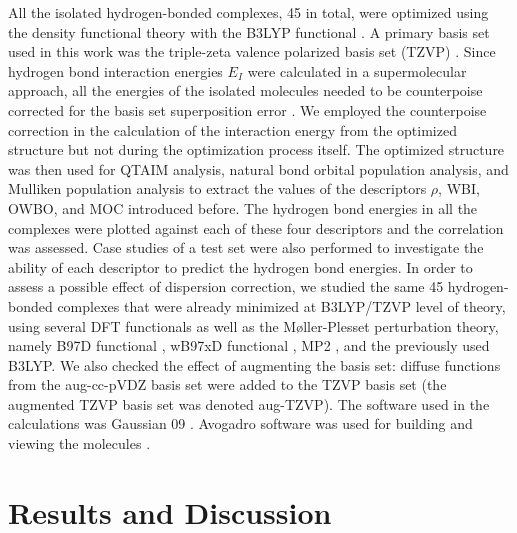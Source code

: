 \documentclass[11pt]{report}
\begin{document}
All the isolated hydrogen-bonded complexes, 45 in total, were optimized using the density functional theory with the B3LYP functional
\cite{Becke1993,Lee1988,Vosko1980}. A primary basis set used in this work was the triple-zeta valence polarized basis set (TZVP)
\cite{Schaeffer1992,Schaeffer1994}. Since hydrogen bond interaction energies $E_I$ were calculated in a supermolecular approach, all the energies of the isolated molecules needed to be counterpoise corrected for the basis set superposition error
\cite{Boys1970,Simon1996}. 
We employed the counterpoise correction in the calculation of the interaction energy from the optimized structure but not during the optimization process itself. 
The optimized structure was then used for QTAIM analysis, natural bond orbital population analysis, and Mulliken population analysis to extract the values of the descriptors $\rho$, WBI, OWBO, and MOC introduced before. The hydrogen bond energies in all the complexes were plotted against each of these four descriptors and the correlation was assessed. Case studies of a test set were also performed to investigate the ability of each descriptor to predict the hydrogen bond energies. In order to assess a possible effect of dispersion correction, we studied the same 45 hydrogen-bonded complexes that were already minimized at B3LYP/TZVP level of theory, using several DFT functionals as well as the M{\o}ller-Plesset perturbation theory, namely B97D functional
\cite{Grimme2006}, wB97xD functional
\cite{Jeng-Da2008,Jeng-Da20082}, 
MP2 \cite{Moller1934,HeadGordon1988,Frisch1990}, 
and the previously used B3LYP. We also checked the effect of augmenting the basis set: diffuse functions from the aug-cc-pVDZ basis set
\cite{ccpVTZ,Kendall1992} were added to the TZVP basis set (the augmented TZVP basis set was denoted aug-TZVP). The software used in the calculations was Gaussian 09
\cite{g09}. Avogadro software was used for building and viewing the molecules
\cite{Hanwell2012}.

\section{Results and Discussion}
\label{s:HBP-Results}
\end{document}
